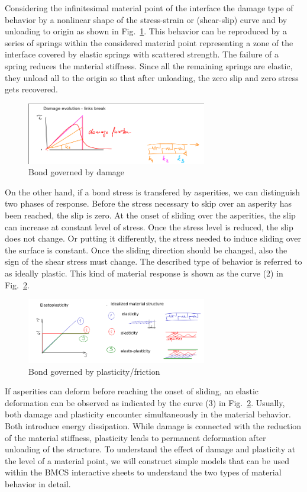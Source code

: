 \documentclass[main.tex]{subfiles}
\begin{document}
Considering the infinitesimal material point of the interface the damage type of behavior 
by a nonlinear shape of the stress-strain or (shear-slip) curve and by unloading to origin
as shown in Fig.~\ref{FIGSourcesOfDamage}. This behavior can be reproduced by a series of springs
within the considered material point representing a zone of the interface covered by elastic 
springs with scattered strength. The failure of a spring reduces the material stiffness. Since all the remaining
springs are elastic, they unload all to the origin so that after unloading, the zero slip and zero stress 
gets recovered.
\begin{figure}[ht]
	\centering
  \includegraphics[width=0.7\textwidth]{drawings/damage.png}
	\caption{Bond governed by damage}
	\label{FIGSourcesOfDamage}
\end{figure}

On the other hand, if a bond stress is transfered by asperities, we can distinguish two phases of response.
Before the stress necessary to skip over an asperity has been reached, the slip is zero. At the onset of 
sliding over the asperities, the slip can increase at constant level of stress. Once the stress level 
is reduced, the slip does not change. Or putting it differently, the stress needed to induce sliding over the 
surface is constant. Once the sliding direction should be changed, 
also the sign of the shear stress must change. The described type of behavior is referred 
to as ideally plastic. This kind of material response is shown as the curve (2) in Fig.~\ref{FIGSourcesOfPlasticity}.
\begin{figure}[ht]
	\centering
  \includegraphics[width=0.7\textwidth]{drawings/plasticity.png}
	\caption{Bond governed by plasticity/friction}
	\label{FIGSourcesOfPlasticity}
\end{figure}
If asperities can deform before reaching the onset of sliding, an elastic deformation can be observed as indicated
by the curve (3) in Fig.~\ref{FIGSourcesOfPlasticity}.  
Usually, both damage and plasticity encounter simultaneously in the material behavior.
Both introduce energy dissipation. While damage is connected with the reduction of the 
material stiffness, plasticity leads to permanent deformation after unloading of the structure.
To understand the effect of damage and plasticity at the level of a material point, we will 
construct simple models that can be used within the BMCS interactive sheets to understand 
the two types of material behavior in detail.
\end{document}
